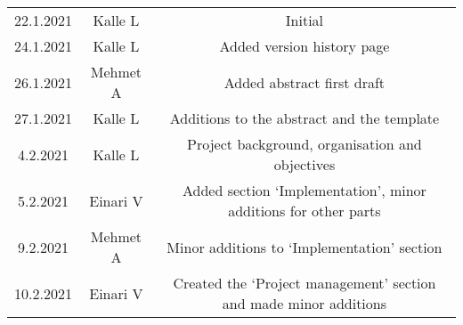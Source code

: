 \begin{center}
	\begin{tabular}{ c c c }
		22.1.2021 & Kalle L & Initial \\ 
		24.1.2021 & Kalle L & Added version history page \\
		26.1.2021 & Mehmet A & Added abstract first draft \\ 
		27.1.2021 & Kalle L & Additions to the abstract and the template \\
		4.2.2021 & Kalle L & Project background, organisation and objectives \\ 
		5.2.2021 & Einari V & Added section `Implementation', minor additions for other parts \\
		9.2.2021 & Mehmet A & Minor additions to `Implementation' section \\
		10.2.2021 & Einari V & Created the `Project management' section and made minor additions
	\end{tabular}
\end{center}